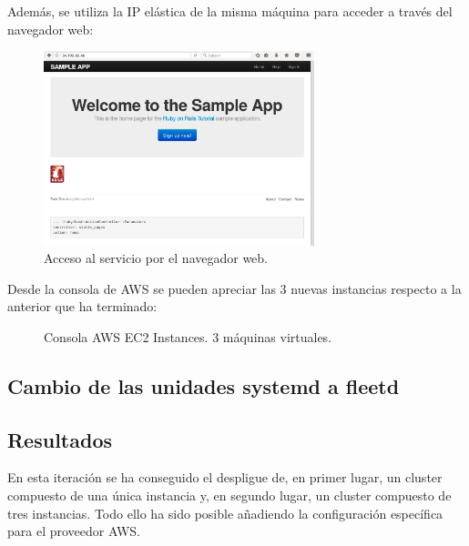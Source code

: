 Además, se utiliza la IP elástica de la misma máquina para acceder a través del navegador web:

\begin{figure}[H]
\centering
\includegraphics[width=0.7\textwidth]{images/figures/access-aws-3.png}
\caption{Acceso al servicio por el navegador web.\label{fig:figure_placement_example}}
\end{figure}

Desde la consola de AWS se pueden apreciar las 3 nuevas instancias respecto a la anterior que ha terminado:

\begin{figure}[H]
\caption{Consola AWS EC2 Instances. 3 máquinas virtuales.\label{fig:figure_placement_example}}
\end{figure}

\subsection{Cambio de las unidades systemd a fleetd}

\subsection{Resultados}

En esta iteración se ha conseguido el despligue de, en primer lugar, un cluster compuesto de una única instancia y, en segundo lugar, un cluster compuesto de tres instancias. Todo ello ha sido posible añadiendo la configuración específica para el proveedor AWS.


